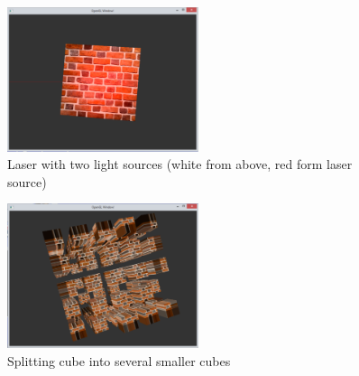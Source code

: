 \documentclass[a4paper]{article}
\begin{document}
\begin{figure}[h!]
  \centering
  \includegraphics[width=0.50\textwidth]{graphics/screen_4.eps}
  \caption{Laser with two light sources (white from above, red form laser
           source)}
  \label{fig:screen_4}
\end{figure}

\begin{figure}[h!]
  \centering
  \includegraphics[width=0.50\textwidth]{graphics/screen_6.eps}
  \caption{Splitting cube into several smaller cubes}
  \label{fig:screen_6}
\end{figure}
\end{document}
